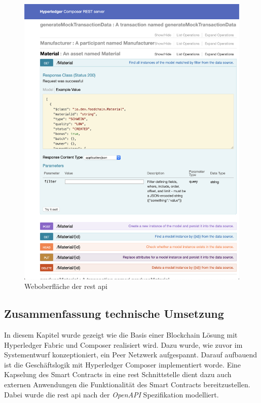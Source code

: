 \begin{figure}[H]
	\centering
	\includegraphics[width=1\linewidth]{pictures/rest-api-explorer}
	\caption[Weboberfläche der \ac{rest} \ac{api}]{Weboberfläche der \ac{rest} \ac{api}}
	\label{fig:rest-api-explorer}
\end{figure}


\subsection{Zusammenfassung technische Umsetzung}
In diesem Kapitel wurde gezeigt wie die Basis einer Blockchain Lösung mit Hyperledger Fabric und Composer realisiert wird. Dazu wurde, wie zuvor im Systementwurf konzeptioniert, ein Peer Netzwerk aufgespannt. Darauf aufbauend ist die Geschäftslogik mit Hyperledger Composer implementiert worde. Eine Kapselung des Smart Contracts in eine \ac{rest} Schnittstelle dient dazu auch externen Anwendungen die Funktionalität des Smart Contracts bereitzustellen. Dabei wurde die \ac{rest} \ac{api} nach der \textit{OpenAPI} Spezifikation modelliert.


\newpage
